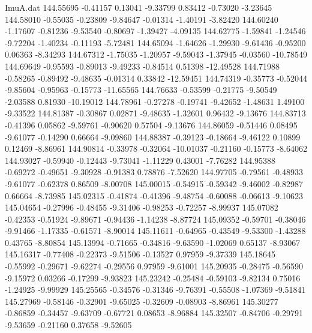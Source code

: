 \begin{filecontents}{ImuA.dat}
 144.55695   -0.41157    0.13041   -9.33799    0.83412   -0.73020   -3.23645
 144.58010   -0.55035   -0.23809   -9.84647   -0.01314   -1.40191   -3.82420
 144.60240   -1.17607   -0.81236   -9.53540   -0.80697   -1.39427   -4.09135
 144.62775   -1.59841   -1.24546   -9.72204   -1.40234   -0.11193   -5.72481
 144.65094   -1.64626   -1.29930   -9.61436   -0.95200    0.06363   -8.34293
 144.67312   -1.75035   -1.20957   -9.59043   -1.37945   -0.03560  -10.78549
 144.69649   -0.95593   -0.89013   -9.49233   -0.84514    0.51398  -12.49528
 144.71988   -0.58265   -0.89492   -9.48635   -0.01314    0.33842  -12.59451
 144.74319   -0.35773   -0.52044   -9.85604   -0.95963   -0.15773  -11.65565
 144.76633   -0.53599   -0.21775   -9.50549   -2.03588    0.81930  -10.19012
 144.78961   -0.27278   -0.19741   -9.42652   -1.48631    1.49100   -9.33522
 144.81387   -0.30867    0.02871   -9.48635   -1.32601    0.96432   -9.13676
 144.83713   -0.41396    0.05862   -9.59761   -0.90620    0.57504   -9.13676
 144.86059   -0.51446    0.08495   -9.61077   -0.14290    0.66664   -9.09860
 144.88387   -0.39123   -0.18664   -9.46122    0.10899    0.12469   -8.86961
 144.90814   -0.33978   -0.32064  -10.01037   -0.21160   -0.15773   -8.64062
 144.93027   -0.59940   -0.12443   -9.73041   -1.11229    0.43001   -7.76282
 144.95388   -0.69272   -0.49651   -9.30928   -0.91383    0.78876   -7.52620
 144.97705   -0.79561   -0.48933   -9.61077   -0.62378    0.86509   -8.00708
 145.00015   -0.54915   -0.59342   -9.46002   -0.82987    0.66664   -8.73985
 145.02315   -0.41874   -0.41396   -9.48754   -0.60088   -0.06613   -9.10623
 145.04654   -0.27996   -0.48455   -9.31406   -0.98253   -0.72257   -8.99937
 145.07082   -0.42353   -0.51924   -9.89671   -0.94436   -1.14238   -8.87724
 145.09352   -0.59701   -0.38046   -9.91466   -1.17335   -0.61571   -8.90014
 145.11611   -0.64965   -0.43549   -9.53300   -1.43288    0.43765   -8.80854
 145.13994   -0.71665   -0.34816   -9.63590   -1.02069    0.65137   -8.93067
 145.16317   -0.77408   -0.22373   -9.51506   -0.13527    0.97959   -9.37339
 145.18645   -0.55992   -0.29671   -9.62274   -0.29556    0.97959   -9.61001
 145.20935   -0.28475   -0.56590   -9.15972    0.03266   -0.17299   -9.93823
 145.23242   -0.25484   -0.59103   -9.82134    0.75016   -1.24925   -9.99929
 145.25565   -0.34576   -0.31346   -9.76391   -0.55508   -1.07369   -9.51841
 145.27969   -0.58146   -0.32901   -9.65025   -0.32609   -0.08903   -8.86961
 145.30277   -0.86859   -0.34457   -9.63709   -0.67721    0.08653   -8.96884
 145.32507   -0.84706   -0.29791   -9.53659   -0.21160    0.37658   -9.52605

\end{filecontents}
